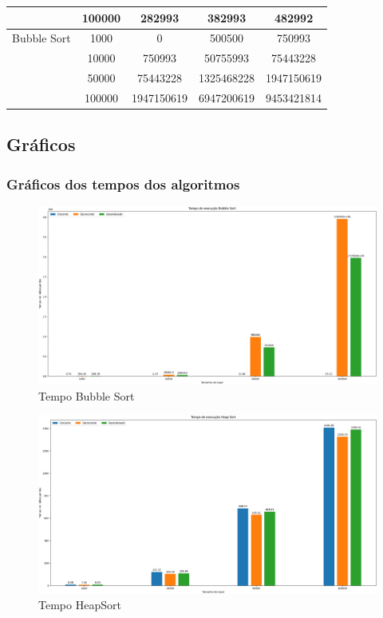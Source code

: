 \documentclass[12pt,a4paper]{article}
\begin{document}
\begin{table}[H]
\begin{tabular}{@{}ccccc@{}}
                            & 100000  & 282993    & 382993      & 482992      \\ \midrule
        Bubble Sort          & 1000    & 0         & 500500      & 750993      \\
                            & 10000   & 750993    & 50755993    & 75443228    \\
                            & 50000   & 75443228  & 1325468228  & 1947150619  \\
                            & 100000  & 1947150619 & 6947200619  & 9453421814  \\ \bottomrule
    \end{tabular}
\end{table}



\subsection{Gráficos}
\subsubsection{Gráficos dos tempos dos algoritmos}
\begin{figure}[H]
    \centering
    \includegraphics[width=\textwidth]{Graficos/Tempos/BubbleSort.png}
    \caption{Tempo Bubble Sort}
    \label{fig:tempBubbleSort}
\end{figure}

\begin{figure}[H]
    \centering
    \includegraphics[width=\textwidth]{Graficos/Tempos/HeapSort.png}
    \caption{Tempo HeapSort}
    \label{fig:tempHeapSort}
\end{figure}
\end{document}
